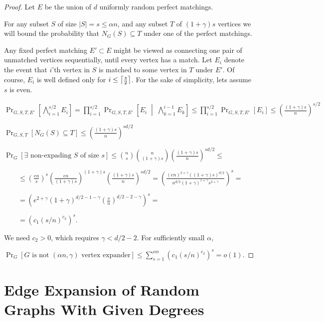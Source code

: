\begin{proof}
    Let $E$ be the union of $d$ uniformly random perfect matchings.
    
    For any subset $S$ of size $|S|=s\leq\alpha n$,
    and any subset $T$ of $(1+\gamma)s$ vertices we will bound the probability that
    $N_G(S)\subseteq T$ under one of the perfect matchings.
    
    Any fixed perfect matching $E'\subset E$ might be viewed as connecting one pair of
    unmatched vertices sequentially, until every vertex has a match.
    Let $E_i$ denote the event that $i$'th vertex in $S$ is matched to some vertex in $T$ under $E'$.
    Of course, $E_i$ is well defined only for $i\leq{\left\lceil{\frac{s}{2}}\right\rceil}$.
    For the sake of simplicity, lets assume $s$ is even.
    
    $\Pr_{G,S,T,E'}\left[\bigwedge\limits_{i=1}^{s/2}{E_i}\right]
    =\prod_{i=1}^{s/2}{\Pr_{G,S,T,E'}\left[E_i\;\middle|\;\bigwedge\limits_{k=1}^{i-1}{E_k}\right]}
    \leq\prod_{i=1}^{s/2}{\Pr_{G,S,T,E'}[E_i]}\leq\left(\frac{(1+\gamma)s}{n}\right)^{s/2}$
    
    $\Pr_{G,S,T}[N_G(S)\subseteq T]\leq\left(\frac{(1+\gamma)s}{n}\right)^{sd/2}$
    
    $\Pr_G[\exists\text{ non-expading }S\text{ of size }s]
    \leq\binom{n}{s}\binom{n}{(1+\gamma)s}\left(\frac{(1+\gamma)s}{n}\right)^{sd/2}\leq$

    $\qquad\leq\left(\frac{en}{s}\right)^s\left(\frac{en}{(1+\gamma)s}\right)^{(1+\gamma)s}\left(\frac{(1+\gamma)s}{n}\right)^{sd/2}
    =\left(\frac{(en)^{2+\gamma}((1+\gamma)s)^{d/2}}
    {n^{d/2}(1+\gamma)^{1+\gamma}s^{2+\gamma}}\right)^s=$
    
    $\qquad=\left(e^{2+\gamma}(1+\gamma)^{d/2-1-\gamma}\left(\frac{s}{n}\right)^{d/2-2-\gamma}\right)^s=$
    
    $\qquad=\left(c_1\left(s/n\right)^{c_2}\right)^s$.
    
    We need $c_2>0$, which requires $\gamma<d/2-2$.
    For sufficiently small $\alpha$,
    
    $\Pr_G[G\text{ is not }(\alpha n,\gamma)\text{ vertex expander}]
    \leq\sum_{s=1}^{\alpha n}{(c_1(s/n)^{c_2})^s}=o(1)$.
\end{proof}

\section{Edge Expansion of Random Graphs With Given Degrees}


